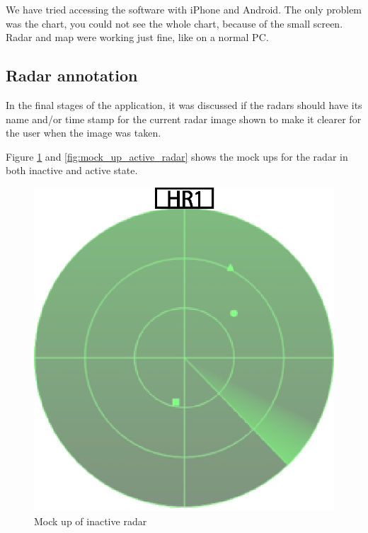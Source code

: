 We have tried accessing the software with iPhone and Android. The only problem was the chart, you could not see the whole chart, because of the small screen. Radar and map were working just fine, like on a normal PC.

\subsection{Radar annotation}
In the final stages of the application, it was discussed if the radars should have its name and/or time stamp for the current radar image shown to make it clearer for the user when the image was taken.

Figure \ref{fig:mock_up_inactive_radar} and \ref{fig:mock_up_active_radar} shows the mock ups for the radar in both inactive and active state.
\begin{figure}[htbp]
  \begin{minipage}[b]{0.5\linewidth}
    \centering
    \includegraphics[width=\linewidth]{figure/radar1.eps}
    \caption{Mock up of inactive radar}
    \label{fig:mock_up_inactive_radar}
  \end{minipage}
  \hspace{0.5cm}
  \begin{minipage}[b]{0.5\linewidth}

\end{minipage}
\end{figure}
